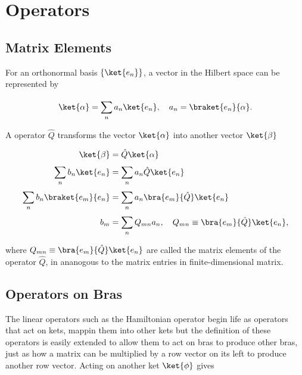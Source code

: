 \documentclass[a4paper,12pt]{report}
\begin{document}
\section{Operators}

\subsection{Matrix Elements}

For an orthonormal basis \(\{\ket{e_{n} }\} \), a vector in the Hilbert space can be represented by 

\begin{equation}
  \ket{\alpha } = \sum_{n}^{} a_{n}\ket{e_{n} }, \quad a_{n} = \braket{e_{n} }{\alpha }.     
\end{equation}

A operator \(\hat{Q} \) transforms the vector \(\ket{\alpha } \) into another vector \(\ket{\beta } \)

\begin{equation}
  \begin{aligned} 
  \ket{\beta } &= \hat{Q} \ket{\alpha }\\
  \sum_{n}^{} b_{n} \ket{e_{n} } &= \sum_{n}^{} a_{n}\hat{Q} \ket{e_{n} }\\
\sum_{n}^{} b_{n} \braket{e_{m} }{e_{n} } &= \sum_{n}^{} a_{n} \bra{e_{m} }{\hat{Q} }\ket{e_{n} }\\
b_{m} &= \sum_{n}^{} Q_{mn}a_{n}, \quad Q_{mn} \equiv \bra{e_{m} }{\hat{Q} }\ket{e_{n} },         
  \end{aligned} 
\end{equation}

where \(Q_{mn} \equiv \bra{e_{m} }{\hat{Q} }\ket{e_{n} } \) are called the matrix elements of the operator \(\hat{Q}\), in ananogous to the matrix entries in finite-dimensional matrix. 



\subsection{Operators on Bras}

The linear operators such as the Hamiltonian operator begin life as operators that act on kets, mappin them into other kets but the definition of these operators is easily extended to allow them to act on bras to produce other bras, just as how a matrix can be multiplied by a row vector on its left to produce another row vector. Acting on another ket \(\ket{\phi } \) gives 
\end{document}
